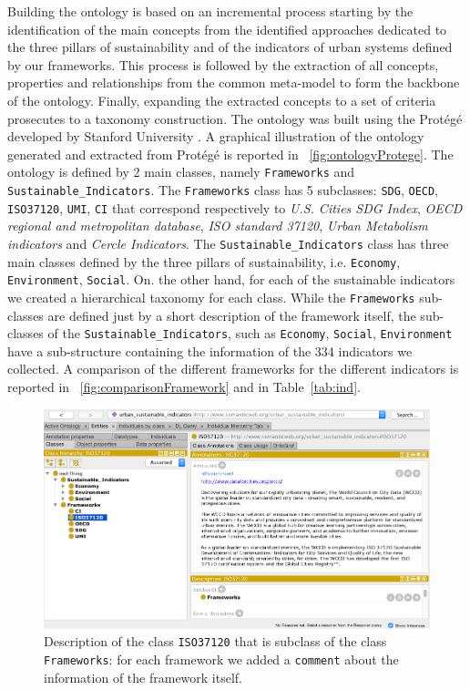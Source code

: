 \documentclass[preprint,12pt]{elsarticle}
\begin{document}
Building the ontology is based on an incremental process starting by the identification of the main concepts from the identified approaches dedicated to the three pillars of sustainability and of the indicators of urban systems defined by our frameworks. This process is followed by the extraction of all concepts, properties and relationships from the common meta-model to form the backbone of the ontology. Finally, expanding the extracted concepts to a set of criteria prosecutes to a taxonomy construction. The ontology was built using the Protégé developed by Stanford University \cite{protege}. A graphical illustration of the ontology generated and extracted from Protégé is reported in \figurename~\ref{fig:ontologyProtege}. The ontology is defined by 2 main classes, namely \texttt{Frameworks} and \texttt{Sustainable\_Indicators}. The \texttt{Frameworks} class has 5 subclasses: \texttt{SDG}, \texttt{OECD}, \texttt{ISO37120}, \texttt{UMI}, \texttt{CI} that correspond respectively to \emph{U.S. Cities SDG Index}, \emph{OECD regional and metropolitan database}, \emph{ISO standard 37120}, \emph{Urban Metabolism indicators} and \emph{Cercle Indicators}. The \texttt{Sustainable\_Indicators} class has three main classes defined by the three pillars of sustainability, i.e. \texttt{Economy}, \texttt{Environment}, \texttt{Social}. On. the other hand, for each of the sustainable indicators we created a hierarchical taxonomy for each class. While the \texttt{Frameworks} sub-classes are defined just by a short description of the framework itself, the sub-classes of the \texttt{Sustainable\_Indicators}, such as \texttt{Economy}, \texttt{Social}, \texttt{Environment} have a sub-structure containing the information of the 334 indicators we collected. A comparison of the different frameworks for the different indicators is reported in \figurename~\ref{fig:comparisonFramework} and in Table~\ref{tab:ind}.



\begin{figure}[t!]
\centering
\includegraphics[width=1\textwidth]{figures/ISO.png}
\caption{Description of the  class \texttt{ISO37120} that is subclass of the class \texttt{Frameworks}: for each framework we added a \texttt{comment} about the information of the framework itself.}
\label{fig:ISO}
\end{figure}
\end{document}
